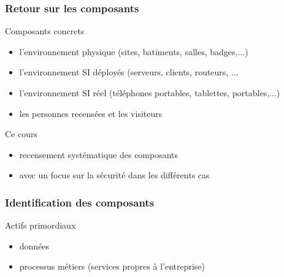


  
\usepackage{ifthen}





\begin{reveals}
		
  \maketitle


  \begin{frame}
    \frametitle{Retour sur les composants}

  \vfill
  \begin{block}{Composants concrets}
    \begin{itemize}
    \item l'environnement physique (sites, batiments, salles, badges,\(\ldots\))
    \item l'environnement SI déployés (serveurs, clients, routeurs, \(\ldots\)
    \item l'environnement SI réel (téléphones portables, tablettes, portables,\(\ldots\))
    \item les personnes recensées et les visiteurs
    \end{itemize}
  \end{block}

  \vfill

\begin{block}{Ce cours}
  \begin{itemize}
  \item recensement systématique des composants
  \item avec un focus sur la sécurité dans les différents cas
  \end{itemize}
  \end{block}

  \vfill

\end{frame}

\begin{frame}
  \frametitle{Identification des composants}

  \vfill

   \begin{block}{Actifs primordiaux}
     \begin{itemize}
     \item données
     \item processus métiers (services propres à l'entreprise)
     \end{itemize}
  \end{block}


\end{frame}
\end{reveals}
